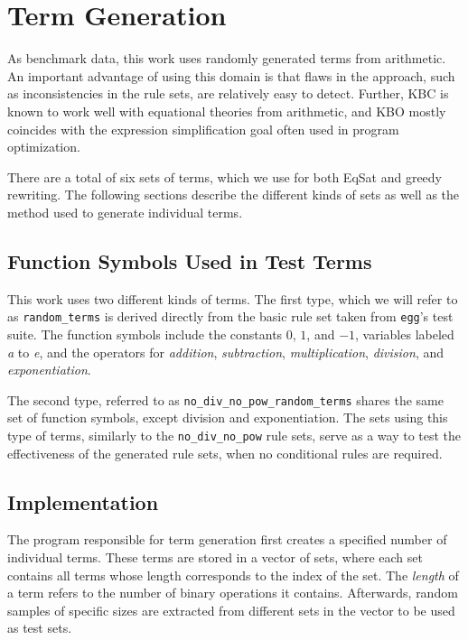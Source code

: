 \FloatBarrier
\section{Term Generation}
\label{sec:term-generation}
As benchmark data, this work uses randomly generated terms from arithmetic. An important advantage of using this domain is that flaws in the approach, such as inconsistencies in the rule sets, are relatively easy to detect. Further, KBC is known to work well with equational theories from arithmetic, and KBO mostly coincides with the expression simplification goal often used in program optimization.

There are a total of six sets of terms, which we use for both EqSat and greedy rewriting. The following sections describe the different kinds of sets as well as the method used to generate individual terms.

\subsection{Function Symbols Used in Test Terms}
\label{sec:function_symbols}
This work uses two different kinds of terms. The first type, which we will refer to as \texttt{random\_terms} is derived directly from the basic rule set taken from \texttt{egg}'s test suite. The function symbols include the constants $0$, $1$, and $-1$, variables labeled \emph{a} to \emph{e}, and the operators for \emph{addition}, \emph{subtraction}, \emph{multiplication}, \emph{division}, and \emph{exponentiation}. 

The second type, referred to as \texttt{no\_div\_no\_pow\_random\_terms} shares the same set of function symbols, except division and exponentiation. The sets using this type of terms, similarly to the \texttt{no\_div\_no\_pow} rule sets, serve as a way to test the effectiveness of the generated rule sets, when no conditional rules are required.

\subsection{Implementation}
The program responsible for term generation first creates a specified number of individual terms. These terms are stored in a vector of sets, where each set contains all terms whose length corresponds to the index of the set. The \emph{length} of a term refers to the number of binary operations it contains. Afterwards, random samples of specific sizes are extracted from different sets in the vector to be used as test sets.

